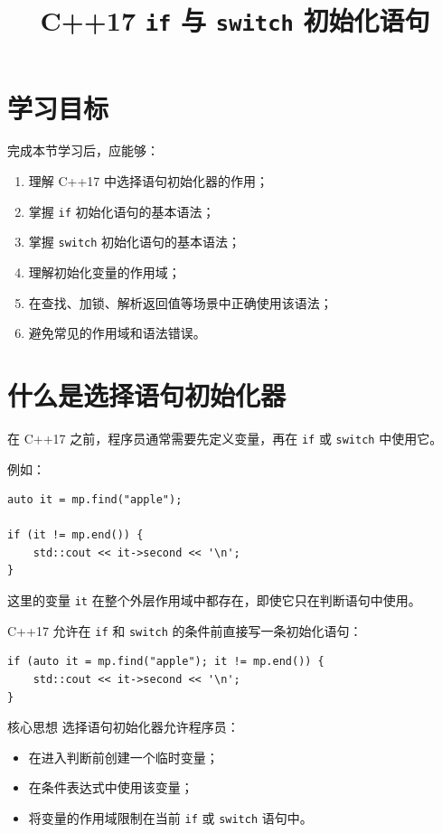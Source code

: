 \documentclass[UTF8,12pt,a4paper]{ctexart}
\title{\textbf{C++17 \texttt{if} 与 \texttt{switch} 初始化语句}}
\author{}
\date{}
\begin{document}
\maketitle

\section{学习目标}

完成本节学习后，应能够：

\begin{enumerate}[label=\arabic*.]
    \item 理解 C++17 中选择语句初始化器的作用；
    \item 掌握 \texttt{if} 初始化语句的基本语法；
    \item 掌握 \texttt{switch} 初始化语句的基本语法；
    \item 理解初始化变量的作用域；
    \item 在查找、加锁、解析返回值等场景中正确使用该语法；
    \item 避免常见的作用域和语法错误。
\end{enumerate}

\section{什么是选择语句初始化器}

在 C++17 之前，程序员通常需要先定义变量，再在 \texttt{if} 或 \texttt{switch} 中使用它。

例如：

\begin{lstlisting}
auto it = mp.find("apple");

if (it != mp.end()) {
    std::cout << it->second << '\n';
}
\end{lstlisting}

这里的变量 \texttt{it} 在整个外层作用域中都存在，即使它只在判断语句中使用。

C++17 允许在 \texttt{if} 和 \texttt{switch} 的条件前直接写一条初始化语句：

\begin{lstlisting}
if (auto it = mp.find("apple"); it != mp.end()) {
    std::cout << it->second << '\n';
}
\end{lstlisting}

\begin{conceptbox}{核心思想}
选择语句初始化器允许程序员：

\begin{itemize}
    \item 在进入判断前创建一个临时变量；
    \item 在条件表达式中使用该变量；
    \item 将变量的作用域限制在当前 \texttt{if} 或 \texttt{switch} 语句中。
\end{itemize}
\end{conceptbox}
\end{document}
